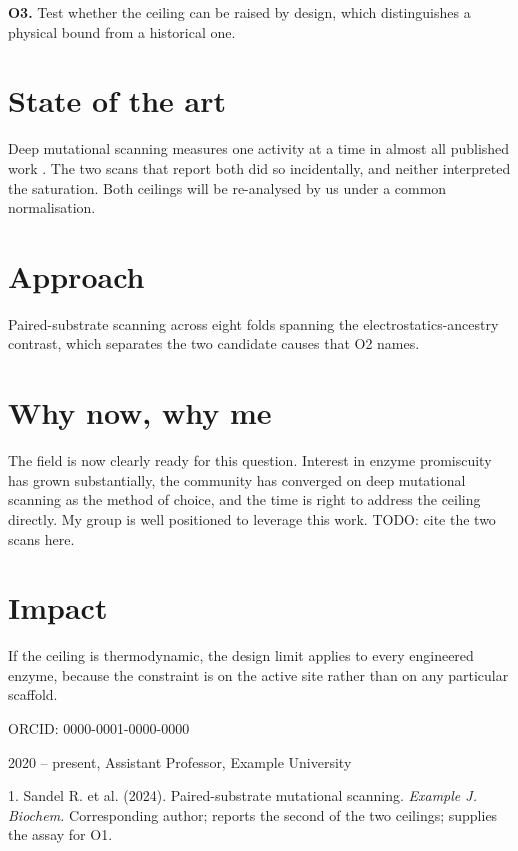 \documentclass[11pt,a4paper]{article}
\begin{document}
\textbf{O3.} Test whether the ceiling can be raised by design, which distinguishes a
physical bound from a historical one.

\section{State of the art}
Deep mutational scanning measures one activity at a time in almost all published work
\citep{}. The two scans that report both did so incidentally, and neither interpreted
the saturation. Both ceilings will be re-analysed by us under a common normalisation.

\section{Approach}
Paired-substrate scanning across eight folds spanning the electrostatics-ancestry
contrast, which separates the two candidate causes that O2 names.

\section{Why now, why me}
The field is now clearly ready for this question. Interest in enzyme promiscuity has
grown substantially, the community has converged on deep mutational scanning as the
method of choice, and the time is right to address the ceiling directly. My group is
well positioned to leverage this work. TODO: cite the two scans here.

\section{Impact}
If the ceiling is thermodynamic, the design limit applies to every engineered enzyme,
because the constraint is on the active site rather than on any particular scaffold.

\startsectionb

ORCID: 0000-0001-0000-0000

2020 -- present, Assistant Professor, Example University

1. Sandel R. et al. (2024). Paired-substrate mutational scanning. \emph{Example J.
Biochem.} Corresponding author; reports the second of the two ceilings; supplies the
assay for O1.
\end{document}
